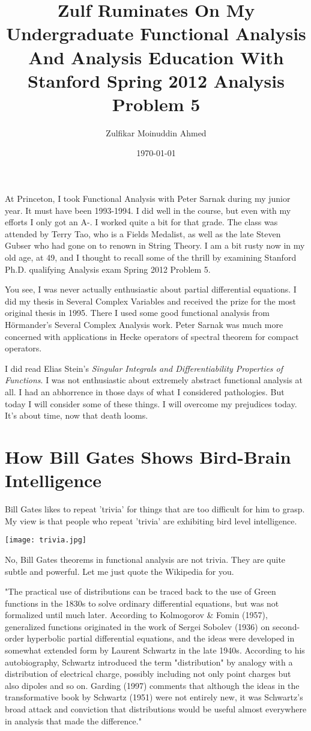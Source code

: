 \documentclass{amsart}
\title{Zulf Ruminates On My Undergraduate Functional Analysis And Analysis Education With Stanford Spring 2012 Analysis Problem 5}
\author{Zulfikar Moinuddin Ahmed}
\date{\today}
\begin{document}
\maketitle

At Princeton, I took Functional Analysis with Peter Sarnak during my junior year.  It must have been 1993-1994.  I did well in the course, but even with my efforts I only got an A-.  I worked quite a bit for that grade.  The class was attended by Terry Tao, who is a Fields Medalist, as well as the late Steven Gubser who had gone on to renown in String Theory.  I am a bit rusty now in my old age, at 49, and I thought to recall some of the thrill by examining Stanford Ph.D. qualifying Analysis exam Spring 2012 Problem 5.  

You see, I was never actually enthusiastic about partial differential equations.  I did my thesis in Several Complex Variables and received the prize for the most original thesis in 1995.  There I used some good functional analysis from H\"ormander's Several Complex Analysis work.  Peter Sarnak was much more concerned with applications in Hecke operators of spectral theorem for compact operators.

I did read Elias Stein's {\em Singular Integrals and Differentiability Properties of Functions}.  I was not enthusiastic about extremely abstract functional analysis at all.  I had an abhorrence in those days of what I considered pathologies.  But today I will consider some of these things.  I will overcome my prejudices today.  It's about time, now that death looms.

\section{How Bill Gates Shows Bird-Brain Intelligence}

Bill Gates likes to repeat 'trivia' for things that are too difficult for him to grasp.  My view is that people who repeat 'trivia' are exhibiting bird level intelligence.

\texttt{[image: trivia.jpg]}

No, Bill Gates theorems in functional analysis are not trivia.  They are quite subtle and powerful.  Let me just quote the Wikipedia for you.

"The practical use of distributions can be traced back to the use of Green functions in the 1830s to solve ordinary differential equations, but was not formalized until much later. According to Kolmogorov \& Fomin (1957), generalized functions originated in the work of Sergei Sobolev (1936) on second-order hyperbolic partial differential equations, and the ideas were developed in somewhat extended form by Laurent Schwartz in the late 1940s. According to his autobiography, Schwartz introduced the term "distribution" by analogy with a distribution of electrical charge, possibly including not only point charges but also dipoles and so on. Garding (1997) comments that although the ideas in the transformative book by Schwartz (1951) were not entirely new, it was Schwartz's broad attack and conviction that distributions would be useful almost everywhere in analysis that made the difference."
\end{document}
